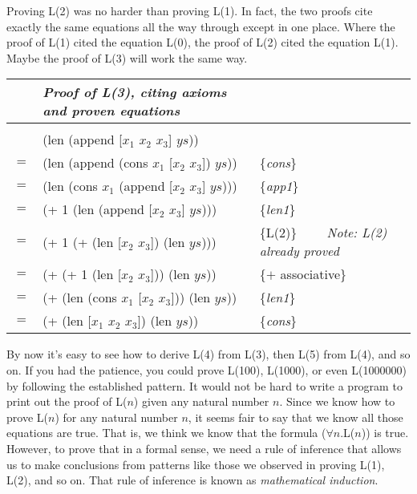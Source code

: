 Proving L(2) was no harder than proving L(1).
In fact, the two proofs cite exactly the same equations all the way through
except in one place.
Where the proof of L(1) cited the equation L(0),
the proof of L(2) cited the equation L(1).
Maybe the proof of L(3) will work the same way.
\begin{center}
\begin{tabular}{lll}
&\emph{Proof of L(3), citing axioms and proven equations}&\\
\hline\\[-1.0em]
    & \textsf{(len (append [$x_1$ $x_2$ $x_3$] $ys$))}         &                     \\
$=$ & \textsf{(len (append (cons $x_1$ [$x_2$ $x_3$]) $ys$))}  & \{\emph{cons}\}     \\
$=$ & \textsf{(len (cons $x_1$ (append [$x_2$ $x_3$] $ys$)))}  & \{\emph{app1}\}     \\
$=$ & \textsf{(+ 1 (len (append [$x_2$ $x_3$] $ys$)))}         & \{\emph{len1}\}     \\
$=$ & \textsf{(+ 1 (+ (len [$x_2$ $x_3$]) (len $ys$)))}        & \{L(2)\} ~~~~\emph{Note: L(2) already proved}\\
$=$ & \textsf{(+ (+ 1 (len [$x_2$ $x_3$])) (len $ys$))}        & \{$+$ associative\} \\
$=$ & \textsf{(+ (len (cons $x_1$ [$x_2$ $x_3$])) (len $ys$))} & \{\emph{len1}\}     \\
$=$ & \textsf{(+ (len [$x_1$ $x_2$ $x_3$]) (len $ys$))}        & \{\emph{cons}\}     \\
\end{tabular}
\end{center}

\label{induction-rationale}
By now it's easy to see how to derive L(4) from L(3),
then L(5) from L(4), and so on.
If you had the patience, you could prove L(100), L(1000), or even L(1000000)
by following the established pattern.
It would not be hard to write a program to print out the proof of L($n$)
given any natural number $n$.
Since we know how to prove L($n$) for any natural number $n$,
it seems fair to say that we know all those equations are true.
That is, we think we know that the formula ($\forall$$n$.L($n$)) is true.
However, to prove that in a formal sense,
we need a rule of inference that allows us to make conclusions
from patterns like those we observed in proving L(1), L(2), and so on.
That rule of inference is known as \emph{mathematical induction}.

